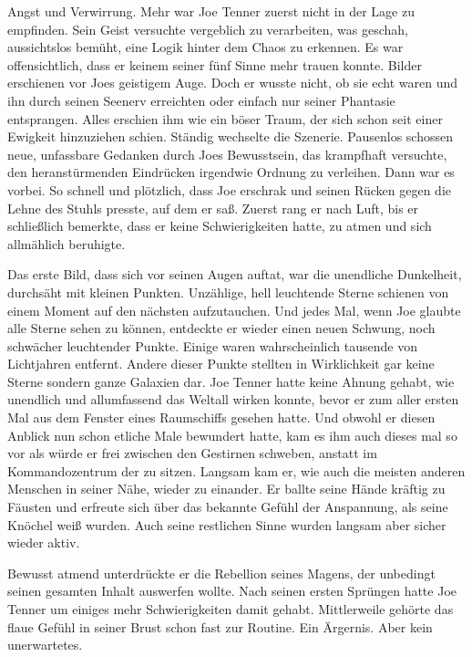 Angst und Verwirrung.
Mehr war Joe Tenner zuerst nicht in der Lage zu empfinden.
Sein Geist versuchte vergeblich zu verarbeiten, was geschah, aussichtslos bemüht, eine Logik hinter dem Chaos zu erkennen.
Es war offensichtlich, dass er keinem seiner fünf Sinne mehr trauen konnte.
Bilder erschienen vor Joes geistigem Auge. Doch er wusste nicht, ob sie echt waren und ihn durch seinen Seenerv erreichten oder einfach nur seiner Phantasie entsprangen.
Alles erschien ihm wie ein böser Traum, der sich schon seit einer Ewigkeit hinzuziehen schien.
Ständig wechselte die Szenerie.
Pausenlos schossen neue, unfassbare Gedanken durch Joes Bewusstsein, das krampfhaft versuchte, den heranstürmenden Eindrücken irgendwie Ordnung zu verleihen.
Dann war es vorbei.
So schnell und plötzlich, dass Joe erschrak und seinen Rücken gegen die Lehne des Stuhls presste, auf dem er saß.
Zuerst rang er nach Luft, bis er schließlich bemerkte, dass er keine Schwierigkeiten hatte, zu atmen und sich allmählich beruhigte.
\par
Das erste Bild, dass sich vor seinen Augen auftat, war die unendliche Dunkelheit, durchsäht mit kleinen Punkten.
Unzählige, hell leuchtende Sterne schienen von einem Moment auf den nächsten aufzutauchen.
Und jedes Mal, wenn Joe glaubte alle Sterne sehen zu können, entdeckte er wieder einen neuen Schwung, noch schwächer leuchtender Punkte. Einige waren wahrscheinlich tausende von Lichtjahren entfernt.
Andere dieser Punkte stellten in Wirklichkeit gar keine Sterne sondern ganze Galaxien dar.
Joe Tenner hatte keine Ahnung gehabt, wie unendlich und allumfassend das Weltall wirken konnte, bevor er zum aller ersten Mal aus dem Fenster eines Raumschiffs gesehen hatte.
Und obwohl er diesen Anblick nun schon etliche Male bewundert hatte, kam es ihm auch dieses mal so vor als würde er frei zwischen den Gestirnen schweben, anstatt im Kommandozentrum der  zu sitzen.
Langsam kam er, wie auch die meisten anderen Menschen in seiner Nähe, wieder zu einander.
Er ballte seine Hände kräftig zu Fäusten und erfreute sich über das bekannte Gefühl der Anspannung, als seine Knöchel weiß wurden.
Auch seine restlichen Sinne wurden langsam aber sicher wieder aktiv.
\par
Bewusst atmend unterdrückte er die Rebellion seines Magens, der unbedingt seinen gesamten Inhalt auswerfen wollte.
Nach seinen ersten Sprüngen hatte Joe Tenner um einiges mehr Schwierigkeiten damit gehabt.
Mittlerweile gehörte das flaue Gefühl in seiner Brust schon fast zur Routine.
Ein Ärgernis.
Aber kein unerwartetes.
\par
